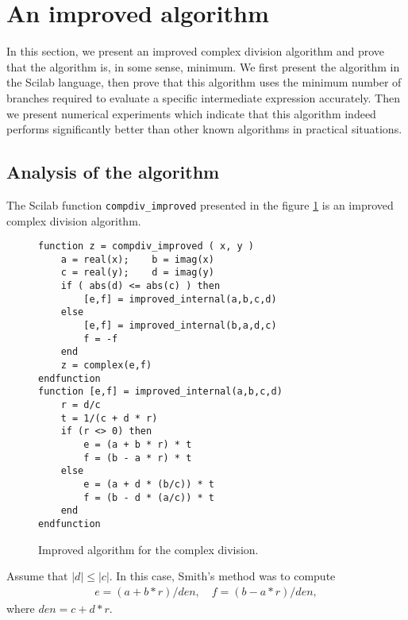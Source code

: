 \documentclass{paper}
\newcommand{\scivar}[1]{\texttt{#1}}
\begin{document}
\section{An improved algorithm}
\label{section-impalgo}

In this section, we present an improved complex division 
algorithm and prove that the algorithm is, in some sense, 
minimum. 
We first present the algorithm in the Scilab language, then 
prove that this algorithm uses the minimum number 
of branches required to evaluate a specific intermediate expression 
accurately. 
Then we present numerical experiments which indicate that this 
algorithm indeed performs significantly better than other 
known algorithms in practical situations.

\subsection{Analysis of the algorithm}

The Scilab function \scivar{compdiv\_improved} presented in the figure \ref{fig-compdiv-algoimproved} 
is an improved complex division algorithm. 

\begin{figure}
\caption{Improved algorithm for the complex division.}
\label{fig-compdiv-algoimproved}
\lstset{language=scilabscript}
\begin{lstlisting}
function z = compdiv_improved ( x, y )
    a = real(x);    b = imag(x)
    c = real(y);    d = imag(y)
    if ( abs(d) <= abs(c) ) then
        [e,f] = improved_internal(a,b,c,d)
    else
        [e,f] = improved_internal(b,a,d,c)
        f = -f
    end
    z = complex(e,f)
endfunction
function [e,f] = improved_internal(a,b,c,d)
    r = d/c
    t = 1/(c + d * r)
    if (r <> 0) then
        e = (a + b * r) * t
        f = (b - a * r) * t
    else
        e = (a + d * (b/c)) * t
        f = (b - d * (a/c)) * t
    end
endfunction
\end{lstlisting}
\end{figure}


Assume that $|d|\leq |c|$. 
In this case, Smith's method was to compute 
\begin{eqnarray}
\label{eq-way-smith0}
    e = (a + b * r) / den, \quad
    f = (b - a * r) / den,
\end{eqnarray}
where $den=c+d*r$.
\end{document}
